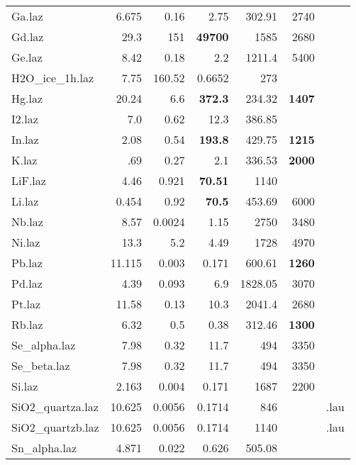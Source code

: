 \begin{table}
\begin{center}
{\begin{small}
\begin{tabular}{|l|rrr|rr|p{}|}
Ga.laz             & 6.675     & 0.16     &2.75      &302.91    &2740&\\
Gd.laz             & 29.3      & 151      &\textbf{49700}     &1585      &2680&\\
Ge.laz             & 8.42      & 0.18     &2.2       &1211.4    &5400  & \\
H2O\_ice\_1h.laz     & 7.75      & 160.52   &0.6652    &273       &     &\\
Hg.laz             & 20.24     & 6.6      &\textbf{372.3}     &234.32    &\textbf{1407}&\\
I2.laz             & 7.0       & 0.62     &12.3      &386.85    &   &\\
In.laz             & 2.08      & 0.54     &\textbf{193.8}     &429.75    &\textbf{1215}&\\
K.laz              & .69       & 0.27     &2.1       &336.53    &\textbf{2000}&\\
LiF.laz            & 4.46      & 0.921    &\textbf{70.51}     &1140      &   &\\
Li.laz             & 0.454     & 0.92     &\textbf{70.5}      &453.69    &6000&\\
Nb.laz             & 8.57      & 0.0024   &1.15      &2750      &3480&\\
Ni.laz             & 13.3      & 5.2      &4.49      &1728      &4970&\\
Pb.laz             & 11.115    & 0.003    &0.171     &600.61    &\textbf{1260}&\\
Pd.laz             & 4.39      & 0.093    &6.9       &1828.05   &3070&\\
Pt.laz             & 11.58     & 0.13     &10.3      &2041.4    &2680&\\
Rb.laz             & 6.32      & 0.5      &0.38      &312.46    &\textbf{1300}  & \\
Se\_alpha.laz       & 7.98      & 0.32     &11.7      &494       &3350&\\
Se\_beta.laz        & 7.98      & 0.32     &11.7      &494       &3350&\\
Si.laz             & 2.163     & 0.004    &0.171     &1687      &2200&\\
SiO2\_quartza.laz   & 10.625    & 0.0056   &0.1714    &846       &      & .lau\\
SiO2\_quartzb.laz   & 10.625    & 0.0056   &0.1714    &1140      &      & .lau\\
Sn\_alpha.laz       & 4.871     & 0.022    &0.626     &505.08    &     &\\

\end{tabular}
\end{small}}
\end{center}
\end{table}
